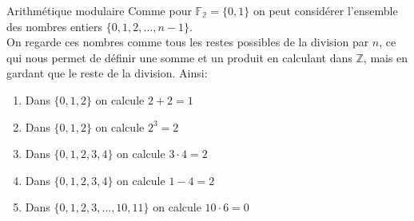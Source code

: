 

\begin{parag}{Arithmétique modulaire}
    Comme pour $\mathbb{F_2} = \{0, 1\}$ on peut considérer l'ensemble des nombres entiers $\{0, 1, 2, \dots, n-1\}$.
    \\
    On regarde ces nombres comme tous les restes possibles de la division par $n$, ce qui nous permet de définir une somme et un produit en calculant dans $\mathbb{Z}$, mais en gardant que le reste de la division. Ainsi:
    \begin{enumerate}
        \item Dans $\{0, 1, 2\}$ on calcule $2 + 2 = 1$
        \item Dans $\{0, 1, 2\}$ on calcule $2^3 =2 $
        \item Dans $\{0, 1, 2, 3, 4\}$ on calcule $3 \cdot 4 = 2$
        \item Dans $\{0, 1, 2, 3, 4\}$ on calcule $1 - 4 = 2 $
        \item Dans $\{0, 1, 2, 3, \dots, 10, 11\}$ on calcule $10 \cdot 6 = 0 $
    \end{enumerate}
\end{parag}

